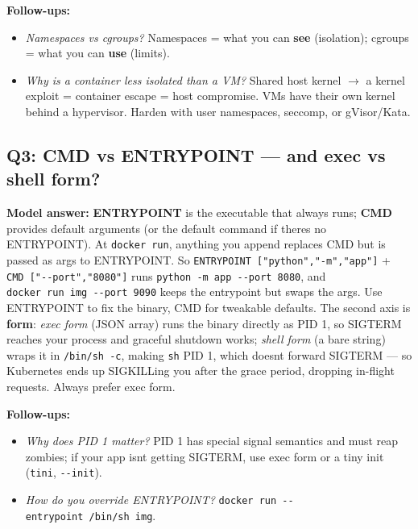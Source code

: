 \documentclass[11pt]{article}
\providecommand{\tightlist}{\setlength{\itemsep}{1pt}\setlength{\parskip}{0pt}}
\begin{document}
\textbf{Follow-ups:}

\begin{itemize}
\tightlist
\item
  \emph{Namespaces vs cgroups?} Namespaces = what you can \textbf{see} (isolation); cgroups = what you can \textbf{use} (limits).
\item
  \emph{Why is a container less isolated than a VM?} Shared host kernel \(\rightarrow\) a kernel exploit = container escape = host compromise. VMs have their own kernel behind a hypervisor. Harden with user namespaces, seccomp, or gVisor/Kata.
\end{itemize}

\subsection{Q3: CMD vs ENTRYPOINT --- and exec vs shell form?}\label{q3-cmd-vs-entrypoint--and-exec-vs-shell-form}

\textbf{Model answer:}
\textbf{ENTRYPOINT} is the executable that always runs; \textbf{CMD} provides default arguments (or the default command if there\textquotesingle s no ENTRYPOINT). At \texttt{docker\ run}, anything you append replaces CMD but is passed as args to ENTRYPOINT. So \texttt{ENTRYPOINT\ {[}"python","-m","app"{]}} + \texttt{CMD\ {[}"-\/-port","8080"{]}} runs \texttt{python\ -m\ app\ -\/-port\ 8080}, and \texttt{docker\ run\ img\ -\/-port\ 9090} keeps the entrypoint but swaps the args. Use ENTRYPOINT to fix the binary, CMD for tweakable defaults. The second axis is \textbf{form}: \emph{exec form} (JSON array) runs the binary directly as PID 1, so SIGTERM reaches your process and graceful shutdown works; \emph{shell form} (a bare string) wraps it in \texttt{/bin/sh\ -c}, making \texttt{sh} PID 1, which doesn\textquotesingle t forward SIGTERM --- so Kubernetes ends up SIGKILLing you after the grace period, dropping in-flight requests. Always prefer exec form.

\textbf{Follow-ups:}

\begin{itemize}
\tightlist
\item
  \emph{Why does PID 1 matter?} PID 1 has special signal semantics and must reap zombies; if your app isn\textquotesingle t getting SIGTERM, use exec form or a tiny init (\texttt{tini}, \texttt{-\/-init}).
\item
  \emph{How do you override ENTRYPOINT?} \texttt{docker\ run\ -\/-entrypoint\ /bin/sh\ img}.
\end{itemize}
\end{document}
